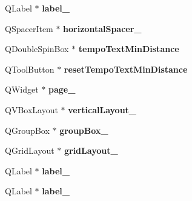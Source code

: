\begin{DoxyCompactItemize}
\item 
\mbox{\label{class_ui___edit_style_base_a501eb08b9a9a28f6be16951db6f9f9c0}} 
Q\+Label $\ast$ {\bfseries label\+\_}
\item 
\mbox{\label{class_ui___edit_style_base_a4b2cfc23354c40b14bd8e8964a623efd}} 
Q\+Spacer\+Item $\ast$ {\bfseries horizontal\+Spacer\+\_}
\item 
\mbox{\label{class_ui___edit_style_base_a84a9994d2d1a75eebbaa0dc9ea5bed99}} 
Q\+Double\+Spin\+Box $\ast$ {\bfseries tempo\+Text\+Min\+Distance}
\item 
\mbox{\label{class_ui___edit_style_base_a2366218e8d27677ad836beffbd72a1f7}} 
Q\+Tool\+Button $\ast$ {\bfseries reset\+Tempo\+Text\+Min\+Distance}
\item 
\mbox{\label{class_ui___edit_style_base_a13f9178370f50707765d8b1a0241cbeb}} 
Q\+Widget $\ast$ {\bfseries page\+\_}
\item 
\mbox{\label{class_ui___edit_style_base_ade761d5255e231b35f38228ba2fd26f0}} 
Q\+V\+Box\+Layout $\ast$ {\bfseries vertical\+Layout\+\_}
\item 
\mbox{\label{class_ui___edit_style_base_a8490a4d30046fc701f137c046249633d}} 
Q\+Group\+Box $\ast$ {\bfseries group\+Box\+\_}
\item 
\mbox{\label{class_ui___edit_style_base_a092cef22f2bc36a689d272a51892ea27}} 
Q\+Grid\+Layout $\ast$ {\bfseries grid\+Layout\+\_}
\item 
\mbox{\label{class_ui___edit_style_base_aec57b17e5ebbe4105945d9938b3e9d04}} 
Q\+Label $\ast$ {\bfseries label\+\_}
\item 
\mbox{\label{class_ui___edit_style_base_a24319892a31e982b9514982ff4619b2a}} 
Q\+Label $\ast$ {\bfseries label\+\_}
\item 
\mbox{\label{class_ui___edit_style_base_ac59ef4aced5bfd9394d7babc2664f719}} 

\end{DoxyCompactItemize}

